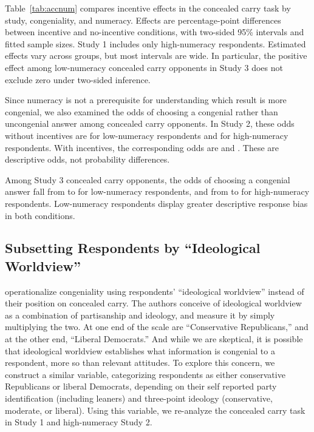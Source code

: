 Table~\ref{tab:accnum} compares incentive effects in the concealed carry task by study, congeniality, and numeracy. Effects are percentage-point differences between incentive and no-incentive conditions, with two-sided 95\% intervals and fitted sample sizes. Study 1 includes only high-numeracy respondents. Estimated effects vary across groups, but most intervals are wide. In particular, the positive effect among low-numeracy concealed carry opponents in Study 3 does not exclude zero under two-sided inference.

\singlespacing
\begingroup\footnotesize\singlespacing

\endgroup
\doublespacing

Since numeracy is not a prerequisite for understanding which result is more congenial, we also examined the odds of choosing a congenial rather than uncongenial answer among concealed carry opponents. In Study 2, these odds without incentives are  for low-numeracy respondents and  for high-numeracy respondents. With incentives, the corresponding odds are  and . These are descriptive odds, not probability differences.

Among Study 3 concealed carry opponents, the odds of choosing a congenial answer fall from  to  for low-numeracy respondents, and from  to  for high-numeracy respondents. Low-numeracy respondents display greater descriptive response bias in both conditions.

\clearpage
\subsection{Subsetting Respondents by ``Ideological Worldview''}
\label{sec:kahan}
\doublespacing

\citet{kahan2017} operationalize congeniality using respondents' ``ideological worldview'' instead of their position on concealed carry. The authors conceive of ideological worldview as a combination of partisanship and ideology, and measure it by simply multiplying the two. At one end of the scale are ``Conservative Republicans,'' and at the other end, ``Liberal Democrats.'' And while we are skeptical, it is possible that ideological worldview establishes what information is congenial to a respondent, more so than relevant attitudes. To explore this concern, we construct a similar variable, categorizing respondents as either conservative Republicans or liberal Democrats, depending on their self reported party identification (including leaners) and three-point ideology (conservative, moderate, or liberal). Using this variable, we re-analyze the concealed carry task in Study 1 and high-numeracy Study 2.  

